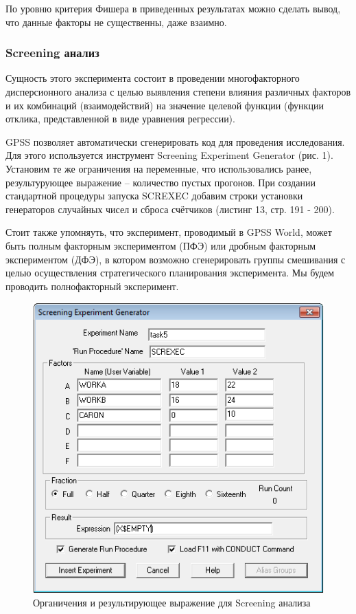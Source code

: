 \documentclass[a4paper, 12pt]{article}        %
\begin{document}


По уровню критерия Фишера в приведенных результатах можно сделать вывод, что данные
факторы не существенны, даже взаимно.

\newpage
\subsubsection{Screening анализ}

Сущность этого эксперимента состоит в проведении многофакторного дисперсионного анализа с целью выявления степени влияния различных факторов и их комбинаций (взаимодействий) на значение целевой функции (функции отклика, представленной в виде уравнения регрессии).

GPSS позволяет автоматически сгенерировать код для проведения исследования. Для этого используется инструмент Screening Experiment Generator (рис. 1). Установим те же ограничения на переменные, что использовались ранее, результурующее выражение -- количество пустых прогонов. При создании стандартной процедуры запуска SCREXEC добавим строки установки генераторов случайных чисел и сброса счётчиков (листинг 13, стр. 191 - 200).

Стоит также упомняуть, что эксперимент, проводимый в GPSS World, может быть полным факторным экспериментом (ПФЭ) или дробным факторным экспериментом (ДФЭ), в котором возможно сгенерировать группы смешивания с целью осуществления стратегического планирования эксперимента. Мы будем проводить полнофакторный эксперимент.

\begin{figure}[h!]
\centering
\includegraphics[scale=1]{res/pic001}
\caption{Органичения и результирующее выражение для Screening анализа}
\end{figure}
\end{document}
